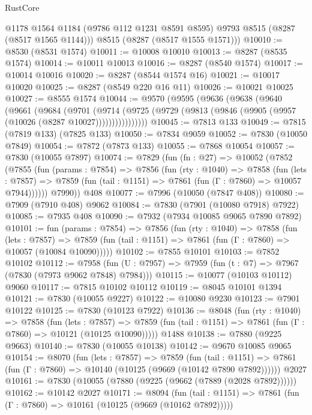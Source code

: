\begin{lexlean}{RustCore}
\begin{coremodule}
        @1178
        @1564
        @1184
        (@9786 @112 @1231 @8591 @8595)
        @9793
        @8515
        (@8287 (@8517 @1565 @1144)))
      @8515
      (@8287 (@8517 @1555 @1571)))
@10010 := @8530 (@8531 @1574)
@10011 := @10008 @10010
@10013 := @8287 (@8535 @1574)
@10014 := @10011 @10013
@10016 := @8287 (@8540 @1574)
@10017 := @10014 @10016
@10020 := @8287 (@8544 @1574 @16)
@10021 := @10017 @10020
@10025 := @8287 (@8549 @220 @16 @11)
@10026 := @10021 @10025
@10027 := @8555 @1574
@10044 := @9570
    (@9595
      (@9636
        (@9638
          (@9640
            (@9661
              (@9684
                (@9701
                  (@9714
                    (@9725 (@9729 (@9813 (@9846 (@9905 (@9957 (@10026 (@8287 @10027))))))))))))))))
@10045 := @7813 @133
@10049 := @7815 (@7819 @133) (@7825 @133)
@10050 := @7834 @9059
@10052 := @7830 (@10050 @7849)
@10054 := @7872 (@7873 @133)
@10055 := @7868 @10054
@10057 := @7830 (@10055 @7897)
@10074 := @7829
    (fun (fn : @27) =>
    @10052
      (@7852
        (@7855
          (fun (params : @7854) =>
          @7856
            (fun (rty : @1040) =>
            @7858
              (fun (lets : @7857) =>
              @7859 (fun (tail : @1151) => @7861 (fun (Γ : @7860) => @10057 @7944))))))
        @7990))
    @408
@10077 := @7996 (@10050 (@7847 @408))
@10080 := @7909 (@7910 @408) @9062
@10084 := @7830 (@7901 (@10080 @7918) @7922)
@10085 := @7935 @408
@10090 := @7932 (@7934 @10085 @9065 @7890 @7892)
@10101 := fun (params : @7854) =>
  @7856
    (fun (rty : @1040) =>
    @7858
      (fun (lets : @7857) =>
      @7859 (fun (tail : @1151) => @7861 (fun (Γ : @7860) => @10057 (@10084 @10090)))))
@10102 := @7855 @10101
@10103 := @7852 @10102
@10112 := @7958 (fun (U : @7957) => @7959 (fun (t : @7) => @7967 (@7830 (@7973 @9062 @7848) @7984)))
@10115 := @10077 (@10103 @10112) @9060
@10117 := @7815 @10102 @10112
@10119 := @8045 @10101 @1394
@10121 := @7830 (@10055 @9227)
@10122 := @10080 @9230
@10123 := @7901 @10122
@10125 := @7830 (@10123 @7922)
@10136 := @8048
    (fun (rty : @1040) =>
    @7858
      (fun (lets : @7857) =>
      @7859 (fun (tail : @1151) => @7861 (fun (Γ : @7860) => @10121 (@10125 @10090)))))
    @1488
@10138 := @7880 (@9225 @9663)
@10140 := @7830 (@10055 @10138)
@10142 := @9670 @10085 @9065
@10154 := @8070
    (fun (lets : @7857) =>
    @7859
      (fun (tail : @1151) =>
      @7861 (fun (Γ : @7860) => @10140 (@10125 (@9669 (@10142 @7890 @7892))))))
    @2027
@10161 := @7830 (@10055 (@7880 (@9225 (@9662 (@7889 (@2028 @7892))))))
@10162 := @10142 @2027
@10171 := @8094
    (fun (tail : @1151) => @7861 (fun (Γ : @7860) => @10161 (@10125 (@9669 (@10162 @7892)))))

\end{coremodule}
\end{lexlean}
